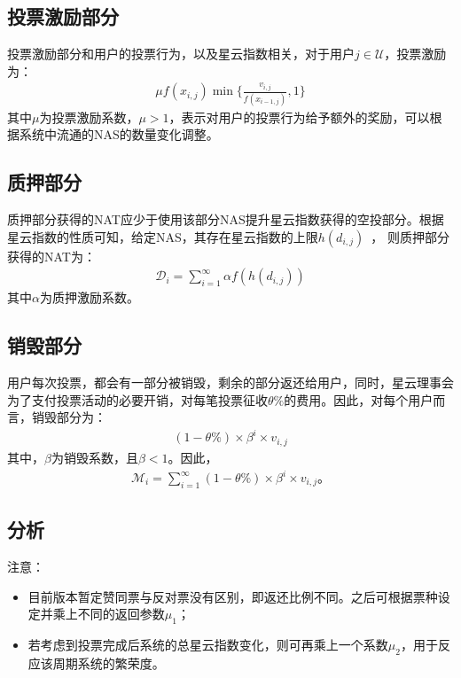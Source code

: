 \subsection{投票激励部分}
投票激励部分和用户的投票行为，以及星云指数相关，对于用户$j \in \mathcal{U}$，投票激励为：
\begin{align}
\mu f(x_{i,j}) \min\{\frac{v_{i,j}}{f(x_{i-1,j})},1\}
\end{align}
\noindent 其中$\mu$为投票激励系数，$\mu > 1$，表示对用户的投票行为给予额外的奖励，可以根据系统中流通的NAS的数量变化调整。

\subsection{质押部分}
质押部分获得的NAT应少于使用该部分NAS提升星云指数获得的空投部分。根据星云指数的性质可知，给定NAS，其存在星云指数的上限$h(d_{i,j})$~\cite{ImproveNR}，
则质押部分获得的NAT为：
\begin{align}
\mathcal{D}_i = \sum_{i=1}^{\infty}\alpha f(h(d_{i,j}))
\end{align}
\noindent 其中$\alpha$为质押激励系数。


\subsection{销毁部分}
\label{burn}
用户每次投票，都会有一部分被销毁，剩余的部分返还给用户，同时，星云理事会为了支付投票活动的必要开销，对每笔投票征收$\theta\%$的费用。因此，对每个用户而言，销毁部分为：
\begin{align}
(1-\theta\%) \times \beta^i \times v_{i,j}
\end{align}
\noindent 其中，$\beta$为销毁系数，且$\beta < 1$。因此，
\begin{align}
    \mathcal{M}_i = \sum_{i=1}^{\infty} (1-\theta\%) \times \beta^i \times v_{i,j} 。
\end{align}

\subsection{分析}

注意：
\begin{itemize}
\item 目前版本暂定赞同票与反对票没有区别，即返还比例不同。之后可根据票种设定并乘上不同的返回参数$\mu_1$；
\item 若考虑到投票完成后系统的总星云指数变化，则可再乘上一个系数$\mu_2$，用于反应该周期系统的繁荣度。
\end{itemize}


